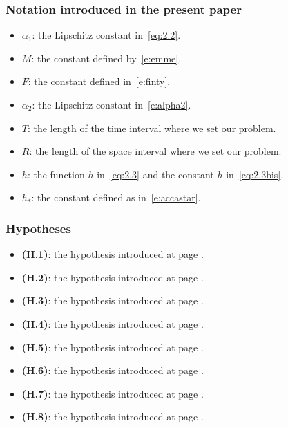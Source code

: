 \documentclass[11pt,leqno]{amsart}
\numberwithin{equation}{section}
\begin{document}
\subsubsection*{Notation introduced in the present paper}
\begin{itemize}
\item $\alpha_1$: the Lipschitz constant in~\eqref{eq:2.2}.
\item $M$: the constant defined by~\eqref{e:emme}.
\item $F$: the constant defined in~\eqref{e:finty}. 
\item $\alpha_2$: the Lipschitz constant in~\eqref{e:alpha2}.
\item $T$: the length of the time interval where we set our problem.
\item $R$: the length of the space interval where we set our problem.
\item $h$: the function $h$ in~\eqref{eq:2.3} and the constant $h$ in~\eqref{eq:2.3bis}. 
\item $h_\ast$: the constant defined as in~\eqref{e:accastar}. 
\end{itemize}
\subsubsection*{Hypotheses}
\begin{itemize}
\item {\bf (H.1)}: the hypothesis introduced at page \pageref{h:accauno}. 
\item {\bf (H.2)}:  the hypothesis introduced at page \pageref{h:accatre}.  
\item {\bf (H.3)}:  the hypothesis introduced at page \pageref{h:acca3}.  
\item {\bf (H.4)}:  the hypothesis introduced at page \pageref{h:accaquattro}.
\item {\bf (H.5)}:  the hypothesis introduced at page \pageref{h:acca5}.
\item {\bf (H.6)}:  the hypothesis introduced at page \pageref{h:accasei}. 
\item {\bf (H.7)}:  the hypothesis introduced at page \pageref{h:accasette}.  
\item {\bf (H.8)}:  the hypothesis introduced at page \pageref{h:accaotto}. 
\end{itemize}
\end{document}
